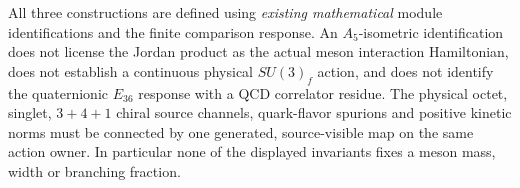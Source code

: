 \documentclass[12pt,a4paper]{article}
\begin{document}
\begin{remark}
\label{p11:rem:v159-nonet-algebra-physical-firewall}
All three constructions are defined using \emph{existing mathematical}
module identifications and the finite comparison response. An
$A_5$-isometric identification does not license the Jordan product
as the actual meson interaction Hamiltonian, does not establish a
continuous physical $SU(3)_f$ action, and does not identify the
quaternionic $E_{36}$ response with a QCD correlator residue.
The physical octet, singlet, $3+4+1$ chiral source channels,
quark-flavor spurions and positive kinetic norms must be connected by
one generated, source-visible map on the same action owner. In
particular none of the displayed invariants fixes a meson mass,
width or branching fraction.
\end{remark}

\end{document}
